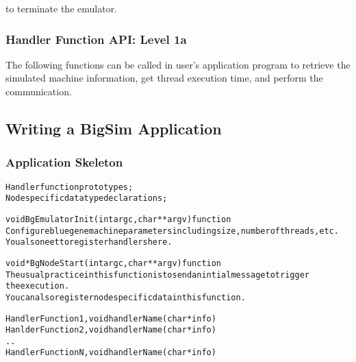 
to terminate the emulator.

\subsubsection{Handler Function API: Level 1a}

The following functions can be called in user's application program to retrieve
the simulated machine information, get thread execution time, and perform the
communication.








\subsection{Writing a BigSim Application}

\subsubsection{Application Skeleton}

\begin{alltt}
Handler function prototypes;
Node specific data type declarations;

void  BgEmulatorInit(int argc, char **argv)  function
  Configure bluegene machine parameters including size, number of threads, etc.
  You also neet to register handlers here.

void *BgNodeStart(int argc, char **argv) function
  The usual practice in this function is to send an intial message to trigger 
  the execution.
  You can also register node specific data in this function.

Handler Function 1, void handlerName(char *info)
Hanlder Function 2, void handlerName(char *info)
..
Handler Function N, void handlerName(char *info)

\end{alltt}

